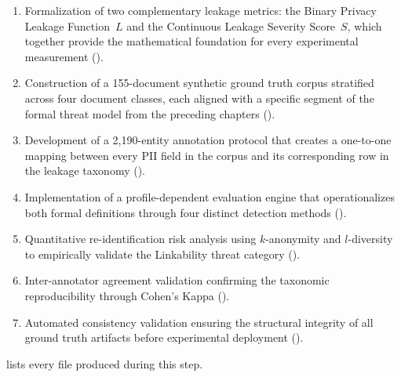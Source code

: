 \documentclass[12pt, a4paper]{report}
\begin{document}
\begin{enumerate}[leftmargin=2em, itemsep=3pt]
  \item Formalization of two complementary leakage metrics: the Binary Privacy Leakage Function~$L$ and the Continuous Leakage Severity Score~$S$, which together provide the mathematical foundation for every experimental measurement ().
  \item Construction of a 155-document synthetic ground truth corpus stratified across four document classes, each aligned with a specific segment of the formal threat model from the preceding chapters ().
  \item Development of a 2{,}190-entity annotation protocol that creates a one-to-one mapping between every PII field in the corpus and its corresponding row in the leakage taxonomy ().
  \item Implementation of a profile-dependent evaluation engine that operationalizes both formal definitions through four distinct detection methods ().
  \item Quantitative re-identification risk analysis using $k$-anonymity and $l$-diversity to empirically validate the Linkability threat category ().
  \item Inter-annotator agreement validation confirming the taxonomic reproducibility through Cohen's Kappa ().
  \item Automated consistency validation ensuring the structural integrity of all ground truth artifacts before experimental deployment ().
\end{enumerate}

 lists every file produced during this step.
\end{document}
